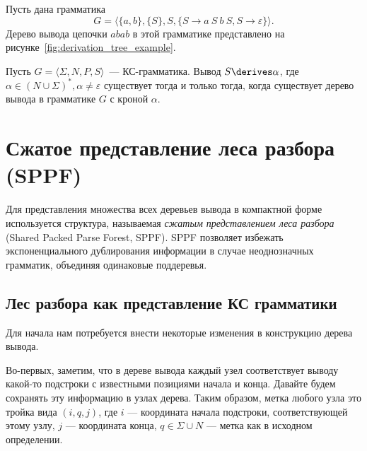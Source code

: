 \begin{example}
    Пусть дана грамматика
    \begin{equation}
        G = \langle \{a,b\}, \{S\}, S, \{S \to a \ S \ b \ S, S \to \varepsilon\} \rangle.\label{eq:grammar}
    \end{equation}
    Дерево вывода цепочки $abab$ в этой грамматике представлено на рисунке~\ref{fig:derivation_tree_example}.

    \begin{marginfigure}
        \begin{center}
            \resizebox{\marginparwidth}{!}{}
        \end{center}
        \caption{Дерева вывода цепочки $abab$ в грамматике~\ref{eq:grammar}}
        \label{fig:derivation_tree_example}
    \end{marginfigure}

\end{example}

\begin{theorem}
    Пусть $G = \langle \Sigma, N, P, S \rangle$~--- КС-грамматика.
    Вывод $S \derives \alpha$, где $\alpha \in (N \cup \Sigma)^*, \alpha \neq \varepsilon$ существует тогда и только тогда, когда существует дерево вывода в грамматике $G$ с кроной $\alpha$.
\end{theorem}

\section{Сжатое представление леса разбора (SPPF)}
\label{sect:SPPF}

Для представления множества всех деревьев вывода в компактной форме используется структура, называемая \emph{сжатым представлением леса разбора} (Shared Packed Parse Forest, SPPF).
SPPF позволяет избежать экспоненциального дублирования информации в случае неоднозначных грамматик, объединяя одинаковые поддеревья.

\subsection{Лес разбора как представление КС грамматики}

Для начала нам потребуется внести некоторые изменения в конструкцию дерева вывода.

Во-первых, заметим, что в дереве вывода каждый узел соответствует выводу какой-то подстроки с известными позициями начала и конца.
Давайте будем сохранять эту информацию в узлах дерева.
Таким образом, метка любого узла это тройка вида $(i,q,j)$, где $i$ --- координата начала подстроки, соответствующей этому узлу, $j$ --- координата конца, $q \in \Sigma \cup N$ --- метка как в исходном определении.

